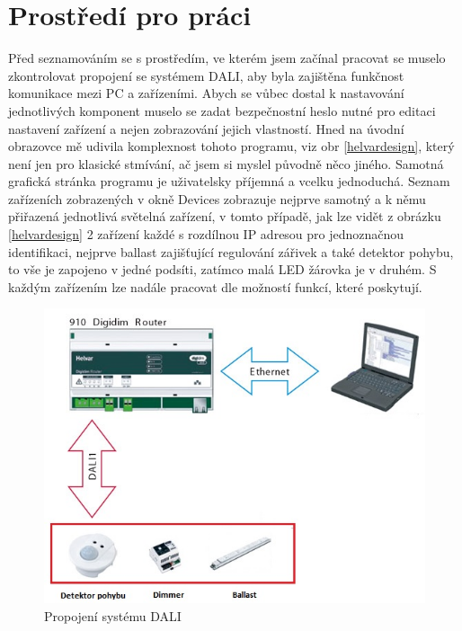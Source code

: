 \documentclass[FM,RP]{tulthesis}
\begin{document}
      \section{Prostředí pro práci}
    Před seznamováním se s prostředím, ve kterém jsem začínal pracovat se muselo zkontrolovat propojení se systémem DALI, aby byla zajištěna funkčnost komunikace mezi PC a zařízeními. Abych se vůbec dostal k nastavování jednotlivých komponent muselo se zadat bezpečnostní heslo nutné pro editaci nastavení zařízení a nejen zobrazování jejich vlastností. Hned na úvodní obrazovce mě udivila komplexnost tohoto programu, viz obr \ref{helvardesign}, který není jen pro klasické stmívání, ač jsem si myslel původně něco jiného. Samotná grafická stránka programu je uživatelsky příjemná a vcelku jednoduchá. Seznam zařízeních zobrazených v okně Devices zobrazuje nejprve samotný a k němu přiřazená jednotlivá světelná zařízení, v tomto případě, jak lze vidět z obrázku \ref{helvardesign} 2 zařízení každé s rozdílnou IP adresou pro jednoznačnou identifikaci, nejprve ballast zajišťující regulování zářivek a také detektor pohybu, to vše je zapojeno v jedné podsíti, zatímco malá LED žárovka je v druhém. S každým zařízením lze nadále pracovat dle možností funkcí, které poskytují. 
    \vspace{5em}
      \begin{figure}[h]
    	\begin{center}
    		\includegraphics[scale=0.7]{dalisystem.jpg}
    		\caption{Propojení systému DALI}
    		\label{dalisystem}
    	\end{center}
    \end{figure}
\end{document}
